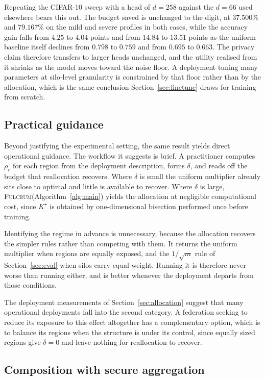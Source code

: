 \documentclass[acmsmall,screen,review,anonymous]{acmart}
\theoremstyle{acmdefinition}%
\newcommand{\Fulcrum}{\textsc{Fulcrum}\xspace}
\begin{document}
Repeating the CIFAR-10 sweep with a head of $d = 258$ against the $d = 66$ used
elsewhere bears this out. The budget saved is unchanged to the digit, at $37.500\%$
and $79.167\%$ on the mild and severe profiles in both cases, while the accuracy
gain falls from $4.25$ to $4.04$ points and from $14.84$ to $13.51$ points as the
uniform baseline itself declines from $0.798$ to $0.759$ and from $0.695$ to
$0.663$. The privacy claim therefore transfers to larger heads unchanged, and the
utility realised from it shrinks as the model moves toward the noise floor. A
deployment tuning many parameters at silo-level granularity is constrained by that
floor rather than by the allocation, which is the same conclusion
Section~\ref{sec:finetune} draws for training from scratch.

\subsection{Practical guidance}

Beyond justifying the experimental setting, the same result yields direct operational guidance. The workflow it suggests is brief. A practitioner computes $\rho_r$ for
each region from the deployment description, forms $\delta$, and reads off the
budget that reallocation recovers. Where $\delta$ is small the uniform multiplier
already sits close to optimal and little is available to recover. Where $\delta$
is large, \Fulcrum (Algorithm~\ref{alg:main}) yields the allocation at negligible
computational cost, since $K^\star$ is obtained by one-dimensional bisection
performed once before training.

Identifying the regime in advance is unnecessary, because the allocation recovers
the simpler rules rather than competing with them. It returns the uniform
multiplier when regions are equally exposed, and the $1/\sqrt{m}$ rule of
Section~\ref{sec:eval} when silos carry equal weight. Running it is therefore
never worse than running either, and is better whenever the deployment departs
from those conditions.

The deployment measurements of Section~\ref{sec:allocation} suggest that many operational
deployments fall into the second category. A federation seeking to reduce its
exposure to this effect altogether has a complementary option, which is to balance
its regions when the structure is under its control, since equally sized regions
give $\delta = 0$ and leave nothing for reallocation to recover.

\subsection{Composition with secure aggregation}
\label{sec:secagg}
\end{document}
